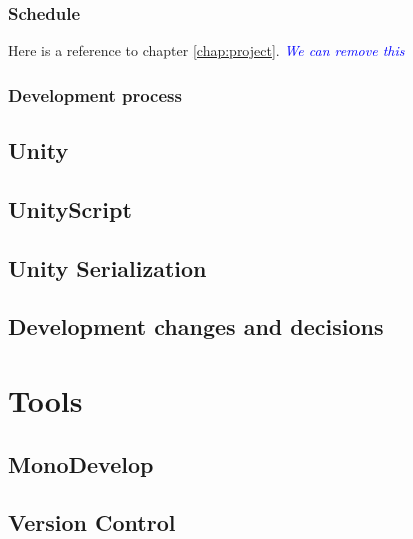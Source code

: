 \documentclass[BSP,english,oneside]{classes/gucthesis}
\newcommand{\comment}[1]{\textcolor{blue}{\emph{#1}}}
\begin{document}
		\section{Schedule}
		
		Here is a reference to chapter \ref{chap:project}. \comment{We can remove this}

		\section{Development process}
		


	\chapter{Unity}
		\label{chap:Unity}
		


	\chapter{UnityScript}
		\label{chap:UnityScript}
		

	\chapter{Unity Serialization}
		\label{chap:UnitySerialization}
		

	\chapter{Development changes and decisions}
		\label{chap:Developmentchangesanddecisions}
		

\part{Tools}

	\chapter{MonoDevelop}
		\label{chap:MonoDevelop}
		


	\chapter{Version Control}
		\label{chap:VersionControl}
		
\end{document}
